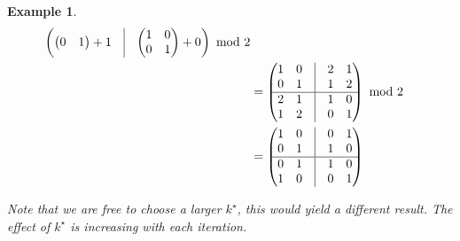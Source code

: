\documentclass[a4paper,11pt]{article}
\theoremstyle{mystyle}
\newtheorem{exmp}{Example}
\begin{document}
\begin{exmp}
\begin{align*}
\begin{pmatrix}
\begin{pmatrix}
0 & 1
\end{pmatrix} + 1 & \vline & \begin{pmatrix}
1 & 0\\
0 & 1
\end{pmatrix} + 0
\end{pmatrix} \text{ mod }2 \\
& = \begin{pmatrix}
\begin{matrix}
1 & 0\\
0 & 1
\end{matrix} & \vline &
\begin{matrix}
2 & 1\\
1 & 2
\end{matrix} \\ \hline
\begin{matrix}
2 & 1\\
1 & 2
\end{matrix} & \vline &
\begin{matrix}
1 & 0\\
0 & 1
\end{matrix}
\end{pmatrix} \text{ mod }2 \\
& = \begin{pmatrix}
\begin{matrix}
1 & 0\\
0 & 1
\end{matrix} & \vline &
\begin{matrix}
0 & 1\\
1 & 0
\end{matrix} \\ \hline
\begin{matrix}
0 & 1\\
1 & 0
\end{matrix} & \vline &
\begin{matrix}
1 & 0\\
0 & 1
\end{matrix}
\end{pmatrix}
\end{align*}

Note that we are free to choose a larger $k^\star$, this would yield a different result. The effect of $k^\star$ is increasing with each iteration.
\end{exmp}


\newpage

\end{document}
